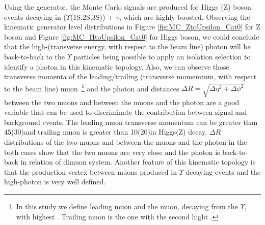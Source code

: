 Using the  generator, the Monte Carlo signals are produced for Higgs (Z) boson events decaying in ($\Upsilon$(1S,2S,3S)) + $\gamma$, which are highly boosted. Observing the kinematic generator level distributions in Figure \ref{fig:MC_ZtoUpsilon_Cat0} for Z boson and Figure \ref{fig:MC_HtoUpsilon_Cat0} for Higgs boson, we could conclude that the high-\ET (transverse energy, with respect to the beam line) photon will be back-to-back to the $\Upsilon$ particles being possible to apply an isolation selection to identify a photon in this kinematic topology. Also, we can observe those transverse momenta of the leading/trailing \PT (transverse momemtum, with respect to the beam line) muon~\footnote{In this study we define leading muon and the muon, decaying from the $\Upsilon$, with highest \PT. Trailing muon is the one with the second hight \PT.} and the photon and distances $\Delta R=\sqrt{\Delta\eta^2 + \Delta\phi^2}$ between the two muons and between the muons and the photon are a good variable that can be used to discriminate the contribution between signal and background events. The leading muon transverse momentum can be greater than 45(30)\GeV and trailing muon is greater than 10(20)\GeV in Higgs(Z) decay.
$\Delta R$ distributions of the two muons and between the muons and the photon in the both cases show that the two muons are very close and the photon is back-to-back in relation of dimuon system. Another feature of this kinematic topology is that the production vertex between muons produced in $\Upsilon$ decaying events and the high-\ET photon is very well defined.  


